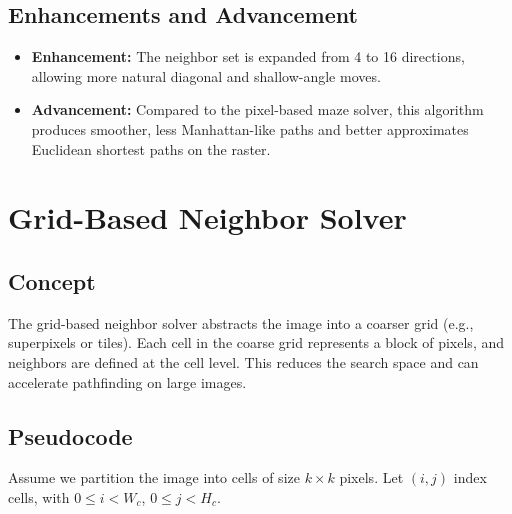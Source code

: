 \documentclass[11pt]{article}
\begin{document}
\subsection{Enhancements and Advancement}

\begin{itemize}
  \item \textbf{Enhancement:} The neighbor set is expanded from 4 to 16
  directions, allowing more natural diagonal and shallow-angle moves.
  \item \textbf{Advancement:} Compared to the pixel-based maze solver,
  this algorithm produces smoother, less Manhattan-like paths and better
  approximates Euclidean shortest paths on the raster.
\end{itemize}
\clearpage
\section{Grid-Based Neighbor Solver}
\label{sec:grid_neighbor}

\subsection{Concept}

The grid-based neighbor solver abstracts the image into a coarser grid
(e.g., superpixels or tiles). Each cell in the coarse grid represents a
block of pixels, and neighbors are defined at the cell level. This
reduces the search space and can accelerate pathfinding on large images.

\subsection{Pseudocode}

Assume we partition the image into cells of size $k \times k$ pixels.
Let $(i,j)$ index cells, with $0 \le i < W_c$, $0 \le j < H_c$.
\end{document}
